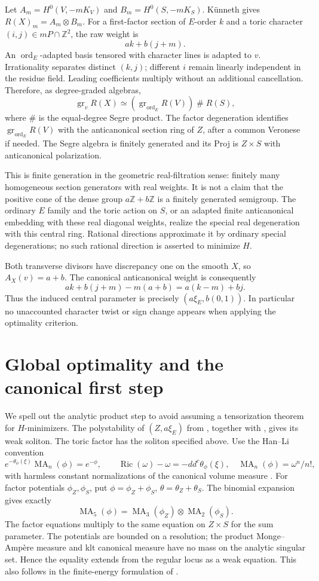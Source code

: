 \documentclass[11pt,a4paper]{article}
\newcommand{\Z}{\mathbb Z}
\newcommand{\ord}{\operatorname{ord}}
\newcommand{\gr}{\operatorname{gr}}
\newcommand{\MA}{\operatorname{MA}}
\newcommand{\Ric}{\operatorname{Ric}}
\begin{document}
Let \(A_m=H^0(V,-mK_V)\) and \(B_m=H^0(S,-mK_S)\).
Künneth gives \(R(X)_m=A_m\otimes B_m\).
For a first-factor section of \(E\)-order \(k\) and a toric
character \((i,j)\in mP\cap\Z^2\), the raw weight is
\[
                  ak+b(j+m).
\]
An \(\ord_E\)-adapted basis tensored with character lines is
adapted to \(v\). Irrationality separates distinct \((k,j)\);
different \(i\) remain linearly independent in the residue field.
Leading coefficients multiply without an additional cancellation.
Therefore, as degree-graded algebras,
\[
       \gr_v R(X)\simeq(\gr_{\ord_E}R(V))\mathbin{\#}R(S),
\]
where \(\#\) is the equal-degree Segre product.
The factor degeneration identifies \(\gr_{\ord_E}R(V)\) with the
anticanonical section ring of \(Z\), after a common Veronese if needed.
The Segre algebra is finitely generated and its Proj is \(Z\times S\)
with anticanonical polarization.

This is finite generation in the geometric real-filtration sense:
finitely many homogeneous section generators with real weights.
It is not a claim that the positive cone of the dense group
\(a\Z+b\Z\) is a finitely generated semigroup.
The ordinary \(E\) family and the toric action on \(S\), or an
adapted finite anticanonical embedding with these real diagonal
weights, realize the special real degeneration with this central ring.
Rational directions approximate it by ordinary special degenerations;
no such rational direction is asserted to minimize \(H\).

Both transverse divisors have discrepancy one on the smooth \(X\),
so \(A_X(v)=a+b\). The canonical anticanonical weight is consequently
\[
           ak+b(j+m)-m(a+b)=a(k-m)+bj.                 \tag{*}
\]
Thus the induced central parameter is precisely
\((a\xi_E,b(0,1))\). In particular no unaccounted character twist
or sign change appears when applying the optimality criterion.

\section{Global optimality and the canonical first step}

We spell out the analytic product step to avoid assuming a tensorization
theorem for \(H\)-minimizers. The polystability of \((Z,a\xi_E)\)
from \cite{MW}, together with \cite{BLXZ,HLYTD}, gives its weak soliton.
The toric factor has the soliton specified above.
Use the Han--Li convention
\[
 e^{-\theta_\phi(\xi)}\MA_n(\phi)=e^{-\phi},\qquad
 \Ric(\omega)-\omega=-dd^c\theta_\phi(\xi),
 \quad \MA_n(\phi)=\omega^n/n!,
\]
with harmless constant normalizations of the canonical volume measure
\cite[(110)--(111), Remark~2.45]{HL}.
For factor potentials \(\phi_Z,\phi_S\), put
\(\phi=\phi_Z+\phi_S\), \(\theta=\theta_Z+\theta_S\).
The binomial expansion gives exactly
\[
 \MA_5(\phi)=\MA_3(\phi_Z)\otimes\MA_2(\phi_S).
\]
The factor equations multiply to the same equation on \(Z\times S\)
for the sum parameter. The potentials are bounded on a resolution;
the product Monge--Ampère measure and klt canonical measure have
no mass on the analytic singular set. Hence the equality extends
from the regular locus as a weak equation. This also follows in the
finite-energy formulation of \cite{HLYTD}.
\end{document}
